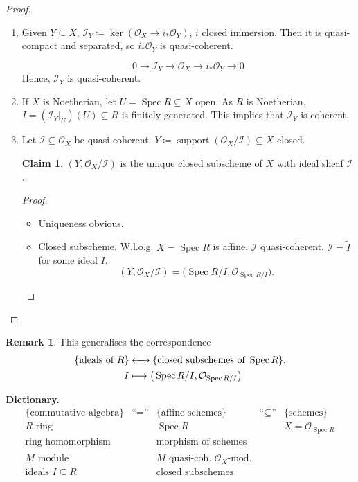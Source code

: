 \documentclass[12pt]{article}
\DeclareMathOperator{\Spec}{Spec}
\DeclareMathOperator{\support}{support}
\theoremstyle{definition}
\newtheorem*{remark}{Remark}
\newtheorem*{claim}{Claim}
\begin{document}
\begin{proof}
\begin{enumerate}[label=\arabic*)]
\item Given $Y\subseteq X$, $\mathcal I_Y\coloneqq\ker(\mathcal O_X\rightarrow i_*\mathcal O_Y)$, $i$ closed immersion. Then it is quasi-compact and separated, so $i_*\mathcal O_Y$ is quasi-coherent.

\[0\longrightarrow\mathcal I_Y\longrightarrow\mathcal O_X\longrightarrow i_*\mathcal O_Y\longrightarrow0\]
Hence, $\mathcal I_Y$ is quasi-coherent.

\item If $X$ is Noetherian, let $U=\Spec R\subseteq X$ open. As $R$ is Noetherian, $I=(\mathcal I_Y|_U)(U)\subseteq R$ is finitely generated. This implies that $\mathcal I_Y$ is coherent.

\item Let $\mathcal I\subseteq\mathcal O_X$ be quasi-coherent. $Y\coloneqq\support(\mathcal O_X/\mathcal I)\subseteq X$ closed.

\begin{claim}
$(Y,\mathcal O_X/\mathcal I)$ is the unique closed subscheme of $X$ with ideal sheaf $\mathcal I$.
\end{claim}

\begin{proof}
\begin{itemize}[label=$-$]
\item Uniqueness obvious.

\item Closed subscheme. W.l.o.g. $X=\Spec R$ is affine. $\mathcal I$ quasi-coherent. $\mathcal I=\widetilde I$ for some ideal $I$.
\[(Y,\mathcal O_X/\mathcal I)=\big(\Spec R/I,\mathcal O_{\Spec R/I}\big).\]
\end{itemize}
\end{proof}
\end{enumerate}
\end{proof}

\begin{remark}
This generalises the correspondence
\begin{align*}
\{\text{ideals of }R\}&\xleftrightarrow{\hspace{4.4mm}}\{\text{closed subschemes of }\Spec R\}.\\I&\longmapsto\big(\Spec R/I,\mathcal O_{\Spec R/I}\big)
\end{align*}
\end{remark}

\textbf{Dictionary.}
\[\begin{array}{ccccc}\{\text{commutative algebra}\}&\text{``}=\text{''}&\{\text{affine schemes}\}&\text{``}\subseteq\text{''}&\{\text{schemes}\}\\R\text{ ring}&&\Spec R&&X=\mathcal O_{\Spec R}\\\text{ring homomorphism}&&\text{morphism of schemes}\\M\text{ module}&&\widetilde M\text{ quasi-coh. }\mathcal O_X\text{-mod.}\\\text{ideals }I\subseteq R&&\text{closed subschemes}\end{array}\]
\end{document}
